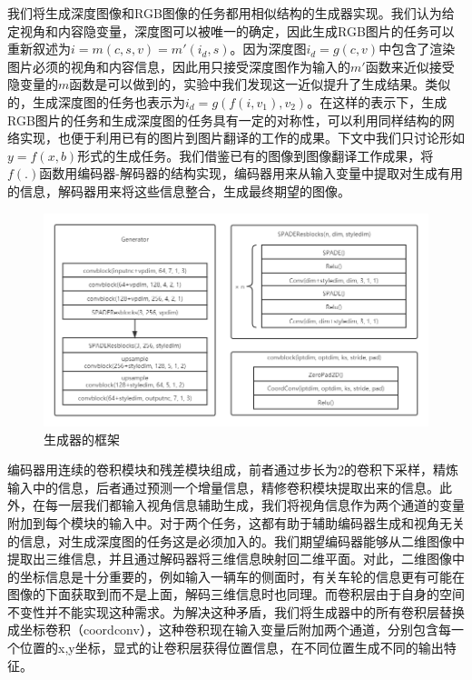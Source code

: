 \documentclass[UTF8,openany,AutoFakeBold,AutoFakeSlant,cs4size]{ctexbook}
\begin{document}
我们将生成深度图像和RGB图像的任务都用相似结构的生成器实现。我们认为给定视角和内容隐变量，深度图可以被唯一的确定，因此生成RGB图片的任务可以重新叙述为$i = m(c, s, v) = m'(i_d, s)$。因为深度图$i_d = g(c, v)$中包含了渲染图片必须的视角和内容信息，因此用只接受深度图作为输入的$m'$函数来近似接受隐变量的$m$函数是可以做到的，实验中我们发现这一近似提升了生成结果。类似的，生成深度图的任务也表示为$i_{d} = g(f(i, v_1), v_2)$。在这样的表示下，生成RGB图片的任务和生成深度图的任务具有一定的对称性，可以利用同样结构的网络实现，也便于利用已有的图片到图片翻译的工作的成果。下文中我们只讨论形如$y = f(x, b)$形式的生成任务。我们借鉴已有的图像到图像翻译工作成果，将$f(.)$函数用编码器-解码器的结构实现，编码器用来从输入变量中提取对生成有用的信息，解码器用来将这些信息整合，生成最终期望的图像。

\begin{figure}
\centering
\includegraphics[width=15cm]{./images/generator.png}
\caption{生成器的框架}
\label{fig:sample}
\end{figure}


编码器用连续的卷积模块和残差模块组成，前者通过步长为2的卷积下采样，精炼输入中的信息，后者通过预测一个增量信息，精修卷积模块提取出来的信息。此外，在每一层我们都输入视角信息辅助生成，我们将视角信息作为两个通道的变量附加到每个模块的输入中。对于两个任务，这都有助于辅助编码器生成和视角无关的信息，对生成深度图的任务这是必须加入的。我们期望编码器能够从二维图像中提取出三维信息，并且通过解码器将三维信息映射回二维平面。对此，二维图像中的坐标信息是十分重要的，例如输入一辆车的侧面时，有关车轮的信息更有可能在图像的下面获取到而不是上面，解码三维信息时也同理。而卷积层由于自身的空间不变性并不能实现这种需求。为解决这种矛盾，我们将生成器中的所有卷积层替换成坐标卷积（coordconv），这种卷积现在输入变量后附加两个通道，分别包含每一个位置的x,y坐标，显式的让卷积层获得位置信息，在不同位置生成不同的输出特征。
\end{document}
